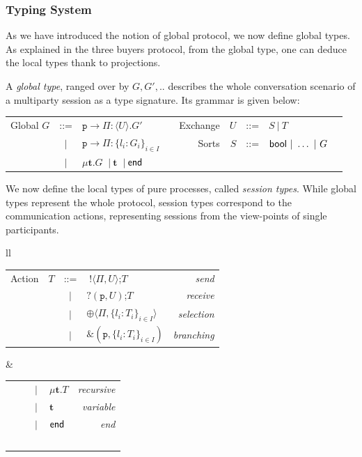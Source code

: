 \documentclass{article}
\newcommand{\ptilde}[1]{{\ensuremath{#1}}}
\newcommand{\kf}[1]{\textup{\textsf{#1}}\xspace}
\newcommand{\pset}{\ensuremath{\Pi}}
\newcommand{\participant}[1]{\ensuremath{\mathtt{#1}}}
\newcommand{\p}{\ensuremath{\participant{p}}}
\newcommand{\sep}{\ensuremath{~\mathbf{|}~ }}
\newcommand{\G}{\ensuremath{G}}
\newcommand{\Gv}[4]{\ensuremath{#1\to\pset:\langle#3\rangle.#4}}
\newcommand{\U}{\ensuremath{U}}
\newcommand{\T}{\ensuremath{T}}
\newcommand{\UT}{\ensuremath{U}}
\newcommand{\oT}[2]{\ensuremath{\;!\langle #2,#1\rangle}}
\newcommand{\iT}[2]{\ensuremath{?( #2,#1 )}}
\newcommand{\ty}{\textbf{t}}
\newcommand{\End}{\kf{end}}
\newcommand{\Bool}{\kf{bool}}
\newcommand{\seltype}{\ensuremath{\oplus \langle \pset,\{l_i:\T_i\}_{i\in
I} \rangle }}
\newcommand{\branchtype}{\ensuremath{\&(\p,\{l_i:\T_i\}_{i\in I})}}
\begin{document}
\subsubsection{Typing System}

As we have introduced the notion of global protocol, we now define global types. As explained in the three buyers protocol, from the global type, one can deduce the local types thank to projections.

A \emph{global type}, ranged over by $G,G',..$
describes the whole conversation scenario of a
multiparty session as a type signature.
Its grammar is given below:

\begin{center}
\begin{tabular}{rclrrrclr}
Global \quad
 $\G$ & ::= & $\Gv\p\p\U{\G'}$  &\quad \quad \quad
& Exchange \quad & $\UT$   & ::= & $\ptilde{S}\ |\ \T$
\\
      & \sep & $\p\rightarrow\pset:\{l_i:\G_i\}_{i\in I}$ &
& Sorts \quad &

  $S$   & ::= & $\Bool\ |\ \ldots\ |\ G$ & \\
      & \sep & $\mu \ty.\G$  \sep $\ty$ \sep $\End$
\end{tabular}
\end{center}

We now define the local types of pure processes, called {\em session
types}.
While global types represent the whole protocol, session types
correspond to the communication actions, representing
sessions from the view-points of single participants.

\begin{center}
\small
\begin{tabular}{ll}
\begin{tabular}{lrclr}
  {Action} \quad \quad & $\T$ & ::= & \oT\UT{\pset};\T \
  & \emph{send}\\ &     & \sep & \iT \UT\p;\T &\emph{receive}\\
         &     & \sep & \seltype &\emph{selection}\\
         &     & \sep & \branchtype &\emph{branching}\\
\end{tabular}&
         \begin{tabular}{lrclr}
         &     & \sep & $\mu \ty.\T$ &\emph{recursive}\\
         &     & \sep & $\ty$  &\emph{variable}\\
         &     & \sep & $\End$ &\emph{end}\\
         &  $\;$   &  &\\
\end{tabular}
\\
\end{tabular}
\end{center}
\end{document}
